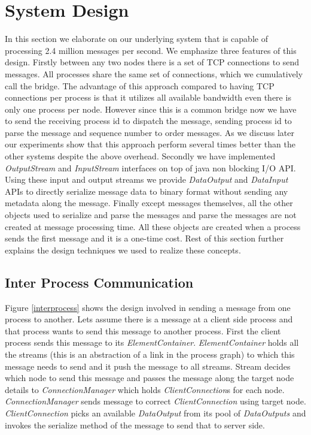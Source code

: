 \section{System Design}
In this section we elaborate on our underlying system that is capable of processing 2.4 million messages per second. We emphasize three features of this design. Firstly between any two nodes there is a set of TCP connections to send messages. All processes share the same set of connections, which we cumulatively call the bridge. The advantage of this approach compared to having TCP connections per process is that it utilizes all available bandwidth even there is only one process per node. However since this is a common bridge now we have to send the receiving process id to dispatch the message, sending  process id to parse the message and sequence number to order messages. As we discuss later our experiments show that this approach perform several times better than the other systems despite the above overhead. Secondly we have implemented \textit{OutputStream} and \textit{InputStream} interfaces on top of java non blocking I/O API. Using these input and output streams we provide \textit{DataOutput} and \textit{DataInput} APIs to directly 
serialize message data to binary format without sending any metadata along the message. Finally except messages themselves, all the other objects used to serialize and parse the messages and parse the messages are not created at message processing time. All these objects are created when a process sends the first message and it is a one-time cost. Rest of this section further explains the design techniques we used to realize these concepts.
\subsection{Inter Process Communication}
Figure \ref{interprocess} shows the design involved in sending a message from one process to another. Lets assume there is a message at a client side process and that process wants to send this message to another process. First the client process sends this message to its \textit{ElementContainer}. \textit{ElementContainer} holds all the streams (this is an abstraction of a link in the process graph) to which this message needs to send and it push the message to all streams. Stream decides which node to send this message and passes the message along the target node details to \textit{ConnectionManager} which holds \textit{ClientConnection}s for each node. \textit{ConnectionManager} sends message to correct \textit{ClientConnection} using target node. \textit{ClientConnection} picks an available \textit{DataOutput} from its pool of \textit{DataOutputs} and invokes the serialize method of the message to send that to server side.

